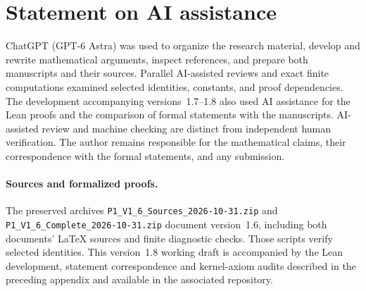 \section*{Statement on AI assistance}

ChatGPT (GPT-6 Astra) was used to organize the research material,
develop and rewrite mathematical arguments, inspect references,
and prepare both manuscripts and their sources.
Parallel AI-assisted reviews and exact finite computations examined
selected identities, constants, and proof dependencies.
The development accompanying versions~1.7--1.8 also used AI assistance
for the Lean proofs and
the comparison of formal statements with the manuscripts.
AI-assisted review and machine checking are distinct from independent
human verification. The author remains responsible for the mathematical
claims, their correspondence with the formal statements, and any submission.

\ifdefined\PoneTechnicalCompanion\else
\paragraph{Sources and formalized proofs.}
The preserved archives \nolinkurl{P1_V1_6_Sources_2026-10-31.zip} and
\nolinkurl{P1_V1_6_Complete_2026-10-31.zip} document version~1.6,
including both documents' LaTeX sources and finite diagnostic checks.
Those scripts verify selected identities.
This version~1.8 working draft is accompanied by the Lean development,
statement correspondence and kernel-axiom audits described in the
preceding appendix and available in the associated repository.
\fi
